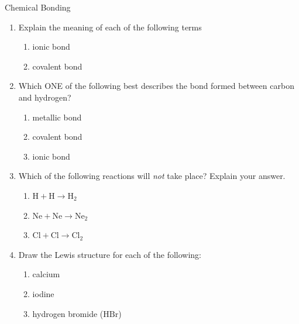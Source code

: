 \label{m38689*secfhsst!!!underscore!!!id1181}
            \begin{eocexercises}{Chemical Bonding}
            \nopagebreak \noindent
      \label{m38689*id147820}\begin{enumerate}[noitemsep, label=\textbf{\arabic*}. ] 
            \label{m38689*uid158}\item Explain the meaning of each of the following terms
\label{m38689*id147842}\begin{enumerate}[noitemsep, label=\textbf{\alph*}. ] 
            \label{m38689*uid159}\item ionic bond
\label{m38689*uid160}\item covalent bond
\end{enumerate}
                \label{m38689*uid162}\item Which ONE of the following best describes the bond formed between carbon and hydrogen?
\label{m38689*id147923}\begin{enumerate}[noitemsep, label=\textbf{\alph*}. ] 
            \label{m38689*uid163}\item metallic bond
\label{m38689*uid164}\item covalent bond
\label{m38689*uid165}\item ionic bond
\end{enumerate}
               \label{m38689*uid171}\item Which of the following reactions will \textsl{not} take place? Explain your answer.
\label{m38689*id148047}\begin{enumerate}[noitemsep, label=\textbf{\alph*}. ] 
            \label{m38689*uid172}\item $\text{H}+\text{H}\to {\text{H}}_{2}$\label{m38689*uid173}\item $\text{Ne}+\text{Ne}\to {\text{Ne}}_{2}$\label{m38689*uid174}\item $\text{Cl}+\text{Cl}\to {\text{Cl}}_{2}$\end{enumerate}
                \label{m38689*uid175}\item Draw the Lewis structure for each of the following:
\label{m38689*id148172}\begin{enumerate}[noitemsep, label=\textbf{\alph*}. ] 
            \label{m38689*uid176}\item calcium
\label{m38689*uid177}\item iodine
\label{m38689*uid178}\item hydrogen bromide ($\text{HBr}$)

\end{enumerate}
\end{enumerate}
\end{eocexercises}
